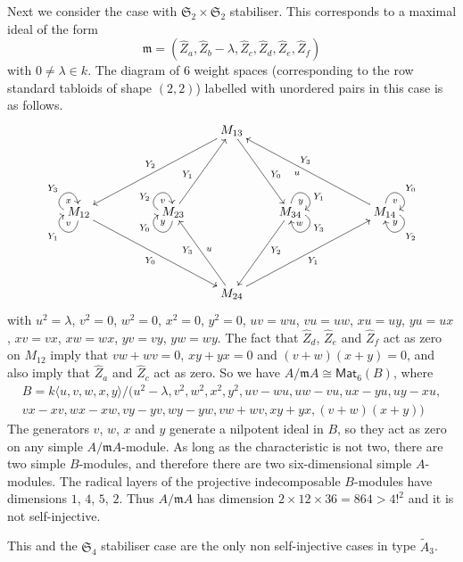 \documentclass[12pt]{amsart}
\newcommand{\Mat}{\mathsf{Mat}}
\newcommand{\sym}[1]{\mathfrak{S}_{#1}}
\newcommand{\mfm}{\mathfrak{m}}
\numberwithin{equation}{section}
\theoremstyle{definition}
\begin{document}
Next we consider the case with $\sym{2}\times\sym{2}$
stabiliser. This corresponds to a maximal ideal of the form
\[ \mfm = (\hat Z_a,\hat Z_b-\lambda,\hat Z_c,\hat Z_d,\hat Z_e,\hat Z_f)\] with $0\neq \lambda \in k$. The diagram of $6$ weight spaces (corresponding to the row standard tabloids of shape $(2,2)$) labelled with unordered pairs in this case is as follows. 
\[ \xymatrix@R=18mm@C=8mm{&&&M_{13}\ar[dlll]_{Y_2}\ar[dr]^(.6){Y_0}\\
M_{12}\ar[drrr]_{Y_0}\ar@(d,l)[]^{Y_1}_v\ar@(l,u)^{Y_3}_x&&
M_{23}\ar[ur]^(.4){Y_1}\ar@(d,l)^(.6){Y_0}_y\ar@(l,u)^(.4){Y_2}_v&&
M_{34}\ar[dl]^(.4){Y_2}\ar@(u,r)^(.6){Y_1}_y\ar@(r,d)^(.4){Y_3}_w&&
M_{14}\ar[ulll]_(.55){Y_3}^(.55)u\ar@(u,r)^{Y_0}_v\ar@(r,d)^{Y_2}_y\\
&&&M_{24}\ar[ul]^(.6){Y_3}_u\ar[urrr]_{Y_1}} \]
with $u^2=\lambda$, $v^2=0$, $w^2=0$, $x^2=0$, $y^2=0$, $uv=wu$, $vu=uw$, $xu=uy$, $yu=ux$, $xv=vx$, $xw=wx$,
$yv=vy$, $yw=wy$. The fact that $\hat Z_d$, $\hat Z_e$ and $\hat
Z_f$ act as zero on $M_{12}$ imply that $vw+wv=0$, $xy+yx=0$ and
$(v+w)(x+y)=0$, and also imply that $\hat Z_a$ and $\hat Z_c$ act as
zero. So we have $A/\mfm A\cong \Mat_6(B)$, where 
\begin{multline*} 
B = k\langle  u,v,w,x,y\rangle/(u^2-\lambda,v^2,w^2,x^2,y^2,
uv-wu,uw-vu,ux-yu,uy-xu,\\
vx-xv,wx-xw,vy-yv,wy-yw,vw+wv,xy+yx,(v+w)(x+y)) 
\end{multline*}
The generators $v$, $w$, $x$ and $y$ generate a nilpotent ideal in
$B$, so they act as zero on any simple $A/\mfm A$-module. As long as the characteristic is not two, there are
two simple $B$-modules, and therefore there are two six-dimensional simple $A$-modules.
The radical layers of the projective
indecomposable $B$-modules have dimensions $1$, $4$, $5$, $2$. 
Thus $A/\mfm A$ has dimension $2\times 12 \times 36 = 864 > 4!^2$ and it is not self-injective.

This and the $\sym{4}$ stabiliser case are the
only non self-injective cases in type $\tilde A_3$.\bigskip
\end{document}
